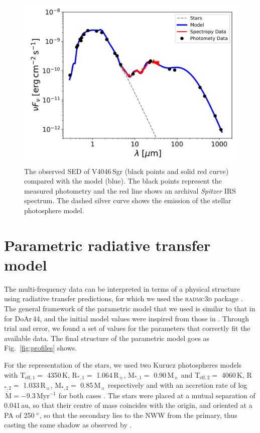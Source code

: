 \documentclass[letters,usenatbib,times]{mnras}
\begin{document}
\begin{figure}
	\centering
	\includegraphics[width=\columnwidth]{SED_.png}
    \caption{The observed SED of V4046\,Sgr (black points and solid red curve) compared with the model (blue). The black points represent the measured photometry and the red line shows an archival \textit{Spitzer} IRS spectrum. The dashed silver curve shows the emission of the stellar photosphere model.}
    \label{fig:SED}
\end{figure}

\section{Parametric radiative transfer model} \label{sec:model}

The multi-frequency data can be interpreted in terms of a physical structure using radiative transfer predictions, for which we used the \textsc{radmc3d} package \citep{Dullemond_2012}. The general framework of the parametric model that we used is similar to that in \citet{2018MNRAS.477.5104C} for DoAr\,44, and the initial model values were inspired from those in \citet{Rosenfeld_2013}. Through trial and error, we found a set of values for the parameters that correctly fit the available data. The final structure of the parametric model goes as Fig.~\ref{fig:profiles} shows.

For the representation of the stars, we used two Kurucz photospheres models \citep{1979ApJS...40....1K, 1997A&A...318..841C} with T$_{\mathrm{eff},1} =$ 4350\,K, R$_{*,1} =$ 1.064\,R$_{\sun}$, M$_{*,1} =$ 0.90\,M$_{\sun}$ and T$_{\mathrm{eff},2} =$ 4060\,K, R$_{*,2} =$ 1.033\,R$_{\sun}$, M$_{*,2} =$ 0.85\,M$_{\sun}$ respectively and with an accretion rate of log$\,\dot{\mathrm{M}} = -$9.3\,Myr$^{-1}$ for both cases \citep{10.1111/j.1365-2966.2011.19366.x}. The stars were placed at a mutual separation of 0.041\,au, so that their centre of mass coincides with the origin, and oriented at a PA of 250\,$\hbox{$^\circ$}$, so that the secondary lies to the NWW from the primary, thus casting the same shadow as observed by \citet{dOrazi}.
\end{document}

